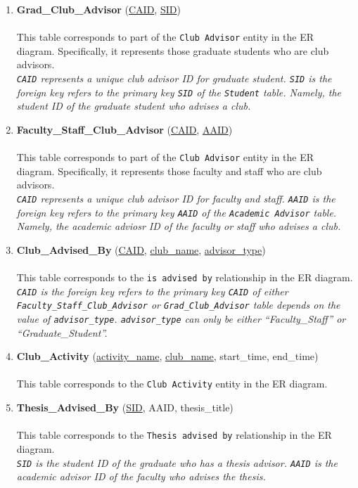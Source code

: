 \documentclass[10pt]{article}
\begin{document}
\begin{enumerate}
\item \textbf{Grad\_Club\_Advisor} (\underline{CAID},
  \underline{SID})\\\\
  This table corresponds to part of the \texttt{Club Advisor}
  entity in the ER diagram. Specifically, it represents those graduate
  students who are club advisors.\\
  \emph{\texttt{CAID} represents a unique club advisor
    ID for graduate student. \texttt{SID} is the 
    foreign key refers to the primary key \texttt{SID} of the
    \texttt{Student} table. Namely, the student ID of the graduate
    student who advises a club.}

\item \textbf{Faculty\_Staff\_Club\_Advisor} (\underline{CAID},
  \underline{AAID})\\\\
  This table corresponds to part of the \texttt{Club Advisor}
  entity in the ER diagram. Specifically, it represents those faculty
  and staff who are club advisors.\\
  \emph{\texttt{CAID} represents a unique club advisor ID for faculty
    and staff. \texttt{AAID} is the
    foreign key refers to the primary key \texttt{AAID} of the
    \texttt{Academic Advisor} table. Namely, the academic adviosr ID
    of the faculty or staff who advises a club.}

\item \textbf{Club\_Advised\_By} (\underline{CAID},
  \underline{club\_name}, \underline{advisor\_type})\\\\
  This table corresponds to the \texttt{is advised by} relationship in
  the ER diagram.\\
  \emph{\texttt{CAID} is the
    foreign key refers to the primary key \texttt{CAID} of either
    \texttt{Faculty\_Staff\_Club\_Advisor} or
    \texttt{Grad\_Club\_Advisor} table depends on the value of
    \texttt{advisor\_type}. \texttt{advisor\_type} can 
    only be either ``Faculty\_Staff'' or ``Graduate\_Student''.}

\item \textbf{Club\_Activity} (\underline{activity\_name},
  \underline{club\_name}, start\_time, end\_time)\\\\
  This table corresponds to the \texttt{Club Activity} entity in
  the ER diagram.\\

\item \textbf{Thesis\_Advised\_By} (\underline{SID}, AAID,
  thesis\_title)\\\\
  This table corresponds to the \texttt{Thesis advised by}
  relationship in the ER diagram.\\
  \emph{\texttt{SID} is the student ID of the graduate who has a
    thesis advisor. \texttt{AAID} is the academic advisor ID of the
    faculty who advises the thesis.}

\end{enumerate}
\end{document}
